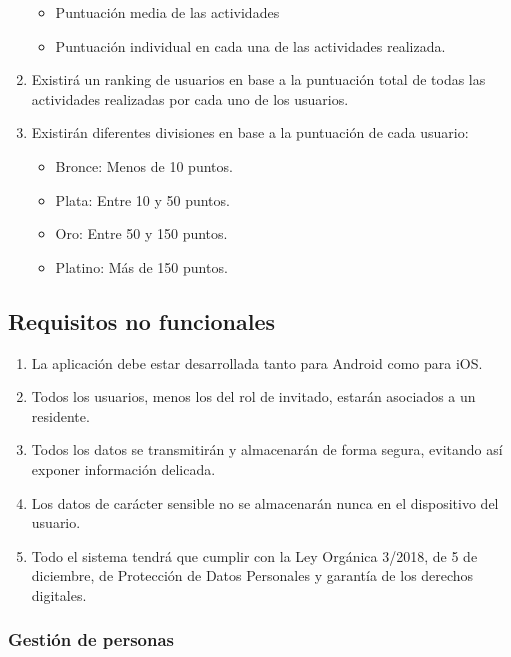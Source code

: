 \begin{enumerate}[start=37,label={RF-\arabic*.}]
\begin{itemize}
            \item Puntuación media de las actividades
            \item Puntuación individual en cada una de las actividades realizada.
        \end{itemize}
    \item Existirá un ranking de usuarios en base a la puntuación total de todas las actividades realizadas por cada uno de los usuarios.
    \item Existirán diferentes divisiones en base a la puntuación de cada usuario:
        \begin{itemize}
            \item Bronce: Menos de 10 puntos.
            \item Plata: Entre 10 y 50 puntos.
            \item Oro: Entre 50 y 150 puntos.
            \item Platino: Más de 150 puntos.
        \end{itemize}

\end{enumerate}

\subsection{Requisitos no funcionales}

\begin{enumerate}[start=1,label={RNF-\arabic*.}]
    \item \label{rnf-plataformas}La aplicación debe estar desarrollada tanto para Android como para iOS.
    \item Todos los usuarios, menos los del rol de invitado, estarán asociados a un residente.
    \item Todos los datos se transmitirán y almacenarán de forma segura, evitando así exponer información delicada.
    \item Los datos de carácter sensible no se almacenarán nunca en el dispositivo del usuario.
    \item Todo el sistema tendrá que cumplir con la Ley Orgánica 3/2018, de 5 de diciembre, de Protección de Datos Personales y garantía de los derechos digitales.
\end{enumerate}

\subsubsection{Gestión de personas}

